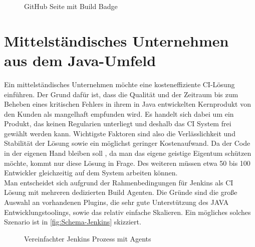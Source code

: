 \begin{figure}[H]
  \centering
  \caption{GitHub Seite mit Build Badge}\label{fig:OpenConjurerFramework}
\end{figure}
\section{Mittelständisches Unternehmen aus dem Java-Umfeld}
Ein mittelständisches Unternehmen möchte eine kosteneffiziente CI-Lösung einführen. Der Grund dafür ist, dass die Qualität und der Zeitraum bis zum Beheben eines kritischen Fehlers in ihrem in Java entwickelten Kernprodukt von den Kunden als mangelhaft empfunden wird. Es handelt sich dabei um ein Produkt, das keinen Regularien unterliegt und deshalb das CI System frei gewählt werden kann. Wichtigste Faktoren sind also die Verlässlichkeit und Stabilität der Lösung sowie ein möglichst geringer Kostenaufwand. Da der Code in der eigenen Hand bleiben soll , da man das eigene geistige Eigentum schützen möchte, kommt nur diese Lösung in Frage. Des weiteren müssen etwa 50 bis 100 Entwickler gleichzeitig auf dem System arbeiten können.\\
Man entscheidet sich aufgrund der Rahmenbedingungen für Jenkins als CI Lösung mit mehreren dedizierten Build Agenten. Die Gründe sind die große Auswahl an vorhandenen Plugins, die sehr gute Unterstützung des JAVA Entwicklungstoolings, sowie das relativ einfache Skalieren. Ein mögliches solches Szenario ist in \autoref{fig:Schema-Jenkins} skizziert.
\begin{figure}[H]
  \centering
  \caption{Vereinfachter Jenkins Prozess mit Agents}\label{fig:Schema-Jenkins}
\end{figure}
